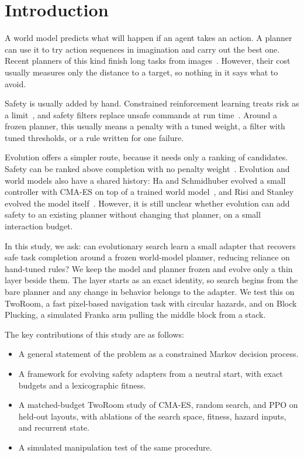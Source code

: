 \documentclass[dvipsnames,format=sigconf]{acmart}
\newcommand{\cmaes}{CMA-ES}
\begin{document}
\section{Introduction}

A world model predicts what will happen if an agent takes an action. A planner can use it to
try action sequences in imagination and carry out the best one. Recent planners of this kind
finish long tasks from images~\cite{maes2026lewm,liu2026aim}. However, their cost usually
measures only the distance to a target, so nothing in it says what to avoid.

Safety is usually added by hand. Constrained reinforcement learning treats risk as a
limit~\cite{achiam2017cpo,carrara2019budgeted}, and safety filters replace unsafe commands at
run time~\cite{seo2025unisafe}. Around a frozen planner, this usually means a penalty with a
tuned weight, a filter with tuned thresholds, or a rule written for one failure.

Evolution offers a simpler route, because it needs only a ranking of candidates. Safety can be
ranked above completion with no penalty weight~\cite{deb2000efficient}. Evolution and world
models also have a shared history: Ha and Schmidhuber evolved a small controller with CMA-ES on
top of a trained world model~\cite{ha2018world}, and Risi and Stanley evolved the model
itself~\cite{risi2019deep}. However, it is still unclear whether evolution can add safety to an
existing planner without changing that planner, on a small interaction budget.

In this study, we ask: can evolutionary search learn a small adapter that recovers safe task
completion around a frozen world-model planner, reducing reliance on hand-tuned rules? We keep
the model and planner frozen and evolve only a thin layer beside them. The layer starts as an
exact identity, so search begins from the bare planner and any change in behavior belongs to
the adapter. We test this on TwoRoom, a fast pixel-based navigation task with circular hazards,
and on Block Plucking, a simulated Franka arm pulling the middle block from a stack.

The key contributions of this study are as follows:
\begin{itemize}
\item A general statement of the problem as a constrained Markov decision process.
\item A framework for evolving safety adapters from a neutral start, with exact budgets and a
lexicographic fitness.
\item A matched-budget TwoRoom study of \cmaes{}, random search, and PPO on held-out layouts,
with ablations of the search space, fitness, hazard inputs, and recurrent state.
\item A simulated manipulation test of the same procedure.
\end{itemize}
\end{document}
